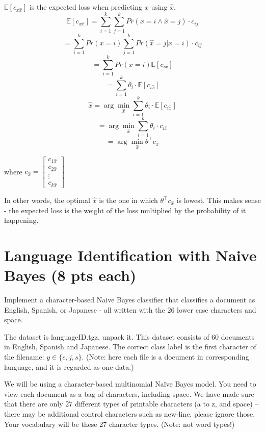 \documentclass[a4paper]{article}
\theoremstyle{definition}
\def\E{\mathbb E}
\newenvironment{soln}{
    \leavevmode\color{blue}\ignorespaces
}{}
\begin{document}
\begin{soln}
	$\E[c_{x \hat x}]$ is the expected loss when predicting $x$ using $\hat x$.
	$$\E[c_{x \hat x}] = \sum_{i=1}^{k} \sum_{j=1}^{k} Pr(x=i \land \hat x=j) \cdot c_{ij}$$
	$$ = \sum_{i=1}^{k} Pr(x=i)\sum_{j=1}^{k} Pr(\hat x=j | x=i) \cdot c_{ij}$$
	$$ = \sum_{i=1}^{k} Pr(x=i) \E[c_{i \hat x}]$$
	$$ = \sum_{i=1}^{k} \theta_i \cdot \E[c_{i \hat x}]$$
	$$\hat x = \arg \min_{\hat x} \sum_{i=1}^{k} \theta_i \cdot \E[c_{i \hat x}]$$
	$$ = \arg \min_{\hat x} \sum_{i=1}^{k} \theta_i \cdot c_{i \hat x}$$
	$$ = \arg \min_{\hat x} \theta^{\top} c_{\hat x}$$
	\begin{center}
		where $c_{\hat x} = \begin{bmatrix}
		c_{1\hat x} \\
		c_{2\hat x} \\
		\vdots \\
		c_{k\hat x}
	\end{bmatrix}$
	\end{center}
	In other words, the optimal $\hat x$ is the one in which $\theta^{\top} c_{\hat x}$ is lowest. This makes sense - the expected loss is the weight of the loss multiplied by the probability of it happening.
\end{soln}


\section{Language Identification with Naive Bayes (8 pts each)}
Implement a character-based Naive Bayes classifier that classifies a document as English, Spanish, or Japanese - all written with the 26 lower case characters and space.

The dataset is languageID.tgz, unpack it.
This dataset consists of 60 documents in English, Spanish and Japanese. 
The correct class label is the first character of the filename: $y \in \{e, j, s\}$. (Note: here each file is a document in corresponding language, and it is regarded as one data.)

We will be using a character-based multinomial Naïve Bayes model.  You need to view each document as a bag of characters, including space.  We have made sure that there are only 27 different types of printable characters (a to z, and space) -- there may be additional control characters such as new-line, please ignore those.  Your vocabulary will be these 27 character types. (Note: not word types!)
\end{document}
